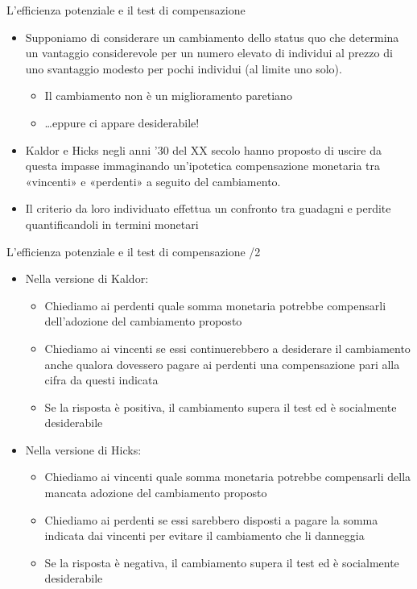 \documentclass[aspectratio=64,11pt]{beamer}
\begin{document}
\begin{frame}{L'efficienza potenziale e il test di compensazione}
\begin{itemize}
\item Supponiamo di considerare un cambiamento dello status quo che determina un vantaggio considerevole per un numero elevato di individui al prezzo di uno svantaggio modesto per pochi individui (al limite uno solo).
\begin{itemize}
\item Il cambiamento non è un miglioramento paretiano
\item \ldots{}eppure ci appare desiderabile!
\end{itemize}
\item Kaldor e Hicks negli anni '30 del XX secolo hanno proposto di uscire da questa impasse immaginando un’ipotetica compensazione monetaria tra «vincenti» e «perdenti» a seguito del cambiamento.
\item Il criterio da loro individuato effettua un confronto tra guadagni e perdite quantificandoli in termini monetari
\end{itemize}
\end{frame}


\begin{frame}{L'efficienza potenziale e il test di compensazione /2}
\begin{itemize}
\item Nella versione di Kaldor:
\begin{itemize}
\item Chiediamo ai perdenti quale somma monetaria potrebbe compensarli dell’adozione del cambiamento proposto
\item Chiediamo ai vincenti se essi continuerebbero a desiderare il cambiamento anche qualora dovessero pagare ai perdenti una compensazione pari alla cifra da questi indicata
\item Se la risposta è positiva, il cambiamento supera il test ed è socialmente desiderabile
\end{itemize}
\item Nella versione di Hicks:
\begin{itemize}
\item Chiediamo ai vincenti quale somma monetaria potrebbe compensarli della mancata adozione del cambiamento proposto
\item Chiediamo ai perdenti se essi sarebbero disposti a pagare la somma indicata dai vincenti per evitare il cambiamento che li danneggia
\item Se la risposta è negativa, il cambiamento supera il test ed è socialmente desiderabile
\end{itemize}
\end{itemize}
\end{frame}
\end{document}
